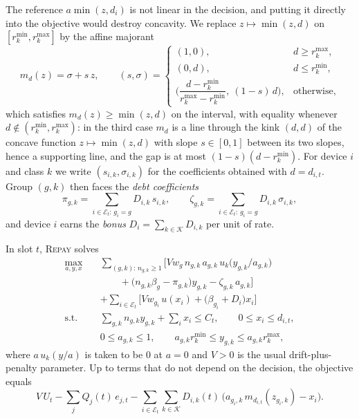 \documentclass[preprint,11pt]{elsarticle}
\theoremstyle{definition}
\theoremstyle{remark}
\newcommand{\rmin}{r^{\min}}
\newcommand{\rmax}{r^{\max}}
\newcommand{\cK}{\mathcal{K}}
\newcommand{\cE}{\mathcal{E}}
\newcommand{\repay}{\textsc{Repay}}
\begin{document}
The reference $a\min(z,d_i)$ is not linear in the decision, and putting it directly into the objective would destroy concavity.
We replace $z\mapsto\min(z,d)$ on $[\rmin_k,\rmax_k]$ by the affine majorant
\begin{equation}\label{eq:maj}
m_d(z)=\sigma+s\,z,\qquad
(s,\sigma)=\begin{cases}
(1,0), & d\ge\rmax_k,\\
(0,d), & d\le\rmin_k,\\
\Big(\dfrac{d-\rmin_k}{\rmax_k-\rmin_k},\ (1-s)\,d\Big), & \text{otherwise,}
\end{cases}
\end{equation}
which satisfies $m_d(z)\ge\min(z,d)$ on the interval, with equality whenever $d\notin(\rmin_k,\rmax_k)$: in the third case $m_d$ is a line through the kink $(d,d)$ of the concave function $z\mapsto\min(z,d)$ with slope $s\in[0,1]$ between its two slopes, hence a supporting line, and the gap is at most $(1-s)(d-\rmin_k)$.
For device $i$ and class $k$ we write $(s_{i,k},\sigma_{i,k})$ for the coefficients obtained with $d=d_{i,t}$.
Group $(g,k)$ then faces the \emph{debt coefficients}
\begin{equation}\label{eq:debt}
\pi_{g,k}=\sum_{i\in\cE_t:\,g_i=g}D_{i,k}\,s_{i,k},\qquad
\zeta_{g,k}=\sum_{i\in\cE_t:\,g_i=g}D_{i,k}\,\sigma_{i,k},
\end{equation}
and device $i$ earns the \emph{bonus} $D_i=\sum_{k\in\cK}D_{i,k}$ per unit of rate.

In slot $t$, \repay{} solves
\begin{equation}\label{eq:slot}
\begin{aligned}
\max_{a,y,x}\quad &\sum_{(g,k):\,n_{g,k}\ge 1}\Big[V w_g\,n_{g,k}\,a_{g,k}\,u_k\!\big(y_{g,k}/a_{g,k}\big)\\&\qquad+\big(n_{g,k}\beta_g-\pi_{g,k}\big)y_{g,k}-\zeta_{g,k}\,a_{g,k}\Big]\\
&+\sum_{i\in\cE_t}\Big[V w_{g_i}\,u(x_i)+\big(\beta_{g_i}+D_i\big)x_i\Big]\\
\text{s.t.}\quad &\textstyle\sum_{g,k}n_{g,k}y_{g,k}+\sum_i x_i\le C_t,\qquad 0\le x_i\le d_{i,t},\\
&0\le a_{g,k}\le 1,\qquad a_{g,k}\rmin_k\le y_{g,k}\le a_{g,k}\rmax_k ,
\end{aligned}
\end{equation}
where $a\,u_k(y/a)$ is taken to be $0$ at $a=0$ and $V>0$ is the usual drift-plus-penalty parameter.
Up to terms that do not depend on the decision, the objective equals
\begin{equation}\label{eq:dpp}
V\,U_t-\sum_jQ_j(t)\,e_{j,t}-\sum_{i\in\cE_t}\sum_{k\in\cK}D_{i,k}(t)\,\big(a_{g_i,k}\,m_{d_{i,t}}(z_{g_i,k})-x_i\big).
\end{equation}
\end{document}
